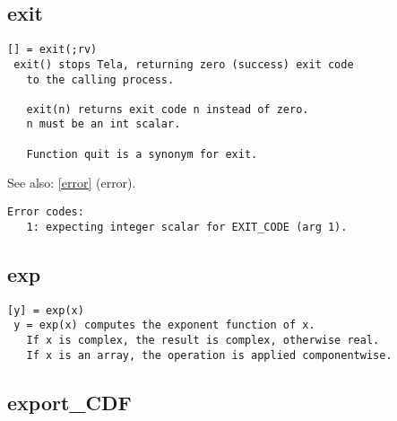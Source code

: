 \documentclass[a4paper]{article}
\begin{document}
\subsection{exit\label{exit}}

\begin{tscreen}
\begin{verbatim}
[] = exit(;rv)
 exit() stops Tela, returning zero (success) exit code
   to the calling process.

   exit(n) returns exit code n instead of zero.
   n must be an int scalar.

   Function quit is a synonym for exit.
\end{verbatim}

See also: \ref{error} {(error)}.
\begin{verbatim}
Error codes:
   1: expecting integer scalar for EXIT_CODE (arg 1).
\end{verbatim}
\end{tscreen}





\subsection{exp\label{exp}}

\begin{tscreen}
\begin{verbatim}
[y] = exp(x)
 y = exp(x) computes the exponent function of x.
   If x is complex, the result is complex, otherwise real.
   If x is an array, the operation is applied componentwise.
\end{verbatim}
\end{tscreen}





\subsection{export\_CDF\label{export_CDF}}
\end{document}

